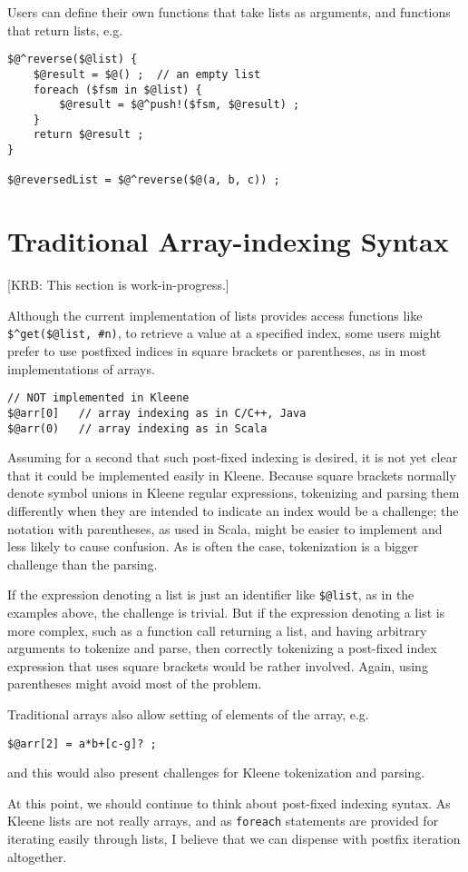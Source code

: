 Users can define their own functions that take lists as arguments, and functions
that return lists, e.g.\@

\begin{Verbatim}
$@^reverse($@list) {
    $@result = $@() ;  // an empty list
    foreach ($fsm in $@list) {
        $@result = $@^push!($fsm, $@result) ;
    }
    return $@result ;
}

$@reversedList = $@^reverse($@(a, b, c)) ;
\end{Verbatim}


\section{Traditional Array-indexing Syntax}


[KRB:  This section is work-in-progress.]

Although the current implementation of lists provides access functions like
\verb!$^get($@list, #n)!, to retrieve a value at a specified index, 
some users might prefer to use postfixed indices in
square brackets or parentheses, as in most implementations of arrays.

\begin{Verbatim}
// NOT implemented in Kleene
$@arr[0]   // array indexing as in C/C++, Java
$@arr(0)   // array indexing as in Scala
\end{Verbatim}

\noindent
Assuming for a second that such post-fixed indexing is desired, it is not yet
clear that it could be implemented easily in Kleene.
Because square brackets normally denote symbol unions in Kleene regular
expressions, tokenizing and
parsing them differently when they are intended to indicate an index would be a
challenge; the notation with parentheses, as used in Scala, might be easier to
implement and
less likely to cause confusion.  As is often the case, tokenization is a bigger
challenge than the parsing.

If the expression denoting a list is just an
identifier like \verb!$@list!, as in the examples above, the challenge is trivial.  But if the
expression denoting a list is more complex, such as a function call returning a list,
and having arbitrary arguments to tokenize and parse, then correctly tokenizing a
post-fixed index expression that uses square brackets would be rather involved.
Again, using parentheses might avoid most of the problem.

Traditional arrays also allow setting of elements of the array, e.g.

\begin{Verbatim}
$@arr[2] = a*b+[c-g]? ;
\end{Verbatim}

\noindent
and this would also present challenges for Kleene tokenization and parsing.

At this point, we should continue to think about post-fixed indexing
syntax.  As Kleene lists are not really arrays, and as \texttt{foreach}
statements are provided for iterating easily through lists, I believe
that we can dispense with postfix iteration altogether.


